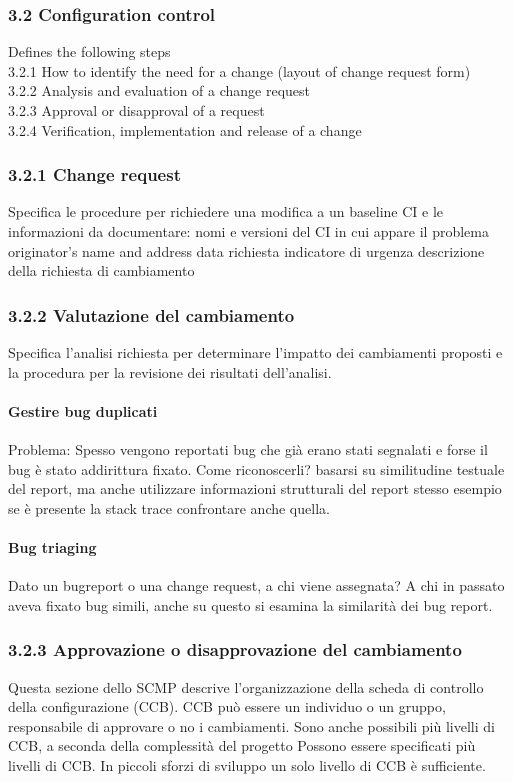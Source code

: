 \documentclass[10pt,a4paper]{book}
\begin{document}
\subsubsection{3.2 Configuration control}
Defines the following steps\\
3.2.1 How to identify the need for a change (layout of change request form)\\
3.2.2 Analysis and evaluation of a change request\\
3.2.3 Approval or disapproval of a request\\
3.2.4 Verification, implementation and release of a change\\

\subsubsection{3.2.1 Change request}
Specifica le procedure per richiedere una modifica a un baseline CI e le informazioni da documentare:
nomi e versioni del CI in cui appare il problema
originator's name and address
data richiesta
indicatore di urgenza
descrizione della richiesta di cambiamento

\subsubsection{3.2.2 Valutazione del cambiamento}
Specifica l'analisi richiesta per determinare l'impatto dei cambiamenti proposti e la procedura per la revisione dei risultati dell'analisi.

\paragraph{Gestire bug duplicati} Problema: Spesso vengono reportati bug che già erano stati segnalati e forse il bug è stato addirittura fixato.
Come riconoscerli? basarsi su similitudine testuale del report, ma anche utilizzare informazioni strutturali del report stesso esempio se è presente la stack trace confrontare anche quella.

\paragraph{Bug triaging} Dato un bugreport o una change request, a chi viene assegnata?
A chi in passato aveva fixato bug simili, anche su questo si esamina la similarità dei bug report.

\subsubsection{3.2.3 Approvazione o disapprovazione del cambiamento}
Questa sezione dello SCMP descrive l'organizzazione della scheda di controllo della configurazione (CCB).
CCB può essere un individuo o un gruppo, responsabile di approvare o no i cambiamenti.
Sono anche possibili più livelli di CCB, a seconda della complessità del progetto
Possono essere specificati più livelli di CCB. In piccoli sforzi di sviluppo un solo livello di CCB è sufficiente.
\end{document}

